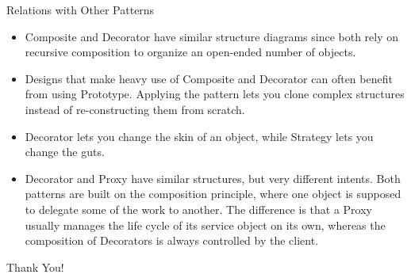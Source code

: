 \documentclass[13pt]{beamer}
\begin{document}
\begin{frame}{Relations with Other Patterns}
	\begin{itemize}
		\item Composite and Decorator have similar structure diagrams since both rely on recursive composition to organize an open-ended number of objects.
		
		\item Designs that make heavy use of Composite and Decorator can often benefit from using Prototype. Applying the pattern lets you clone complex structures instead of re-constructing them from scratch.
		\item Decorator lets you change the skin of an object, while Strategy lets you change the guts.
		\item Decorator and Proxy have similar structures, but very different intents. Both patterns are built on the composition principle, where one object is supposed to delegate some of the work to another. The difference is that a Proxy usually manages the life cycle of its service object on its own, whereas the composition of Decorators is always controlled by the client.
	\end{itemize}
\end{frame}

\begin{frame}
\begin{center}
{\fontsize{40}{50}\selectfont Thank You!}
\end{center}
\end{frame}
\end{document}
